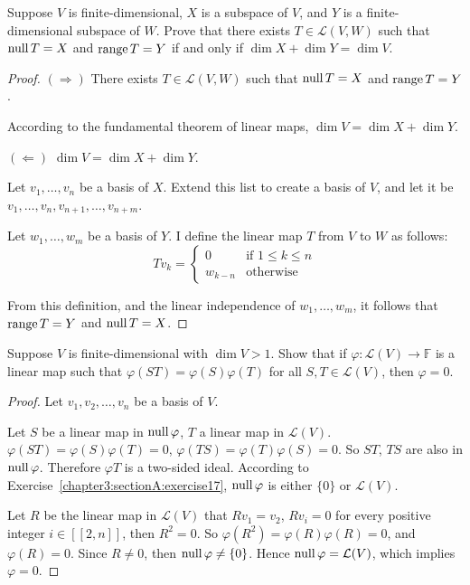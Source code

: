 \begin{exercise}
    Suppose $V$ is finite-dimensional, $X$ is a subspace of $V$, and $Y$ is a finite-dimensional subspace of $W$. Prove that there exists $T \in \mathcal{L}(V, W)$ such that $\text{null}\,{T} = X$ and $\text{range}\,{T} = Y$ if and only if $\dim X + \dim Y = \dim V$.
\end{exercise}

\begin{proof}
    $(\Rightarrow)$ There exists $T \in \mathcal{L}(V, W)$ such that $\text{null}\,{T} = X$ and $\text{range}\,{T} = Y$.

    According to the fundamental theorem of linear maps, $\dim V = \dim X + \dim Y$.

    $(\Leftarrow)$ $\dim V = \dim X + \dim Y$.

    Let $v_{1}, \ldots, v_{n}$ be a basis of $X$. Extend this list to create a basis of $V$, and let it be $v_{1}, \ldots, v_{n}, v_{n+1}, \ldots, v_{n+m}$.

    Let $w_{1}, \ldots, w_{m}$ be a basis of $Y$. I define the linear map $T$ from $V$ to $W$ as follows:
    \[
        Tv_{k} = \begin{cases}
            0       & \text{if $1\leq k\leq n$} \\
            w_{k-n} & \text{otherwise}
        \end{cases}
    \]

    From this definition, and the linear independence of $w_{1}, \ldots, w_{m}$, it follows that $\text{range}\,{T} = Y$ and $\text{null}\,{T} = X$.
\end{proof}
\newpage

\begin{exercise}
    Suppose $V$ is finite-dimensional with $\dim V > 1$. Show that if $\varphi: \mathcal{L}(V) \to \mathbb{F}$ is a linear map such that $\varphi(ST) = \varphi(S)\varphi(T)$ for all $S, T \in \mathcal{L}(V)$, then $\varphi = 0$.
\end{exercise}

\begin{proof}
    Let $v_{1}, v_{2}, \ldots, v_{n}$ be a basis of $V$.

    Let $S$ be a linear map in $\text{null}\,{\varphi}$, $T$ a linear map in $\mathcal{L}(V)$. $\varphi(ST) = \varphi(S)\varphi(T) = 0$, $\varphi(TS) = \varphi(T)\varphi(S) = 0$. So $ST$, $TS$ are also in $\text{null}\,{\varphi}$. Therefore $\varphi{T}$ is a two-sided ideal. According to Exercise~\ref{chapter3:sectionA:exercise17}, $\text{null}\,{\varphi}$ is either $\{0\}$ or $\mathcal{L}(V)$.

    Let $R$ be the linear map in $\mathcal{L}(V)$ that $Rv_{1} = v_{2}$, $Rv_{i} = 0$ for every positive integer $i\in[\![ 2, n ]\!]$, then $R^{2} = 0$. So $\varphi(R^{2}) = \varphi(R)\varphi(R) = 0$, and $\varphi(R) = 0$. Since $R\ne 0$, then $\text{null}\,{\varphi}\ne \{0\}$. Hence $\text{null}\,{\varphi} = \mathcal{L}(V)$, which implies $\varphi = 0$.
\end{proof}
\newpage

